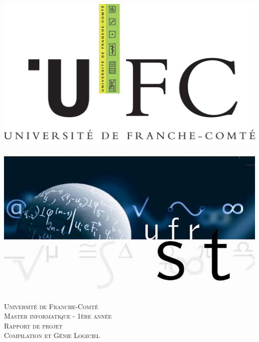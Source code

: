 \documentclass[a4paper,12pt]{report}
\begin{document}
\renewcommand{\chaptername}{Partie}

\renewcommand{\contentsname}{Sommaire}

\begin{titlepage}
  \begin{sffamily}
  \begin{center}

   ~%
   ~%
    \includegraphics[scale=0.1]{ufc.JPG}~~~~~~~
		\includegraphics[scale=0.7]{ufr-st.jpg}\\[0.5cm]

    \textsc{\large Université de Franche-Comté}\\[0.2cm]

    \textsc{\large Master informatique - 1ère année}\\[1.25cm]
		
		\textsc{\huge Rapport de projet\\[0.2cm]Compilation et Génie Logiciel}\\[1.25cm]


\end{center}
\end{sffamily}
\end{titlepage}
\end{document}
